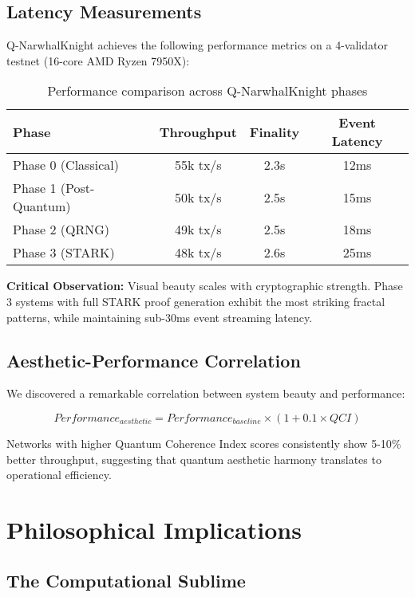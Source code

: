 \documentclass[12pt,a4paper]{article}
\begin{document}
\subsection{Latency Measurements}

Q-NarwhalKnight achieves the following performance metrics on a 4-validator testnet (16-core AMD Ryzen 7950X):

\begin{table}[H]
\centering
\begin{tabular}{|l|c|c|c|}
\hline
\textbf{Phase} & \textbf{Throughput} & \textbf{Finality} & \textbf{Event Latency} \\
\hline
Phase 0 (Classical) & 55k tx/s & 2.3s & 12ms \\
Phase 1 (Post-Quantum) & 50k tx/s & 2.5s & 15ms \\
Phase 2 (QRNG) & 49k tx/s & 2.5s & 18ms \\
Phase 3 (STARK) & 48k tx/s & 2.6s & 25ms \\
\hline
\end{tabular}
\caption{Performance comparison across Q-NarwhalKnight phases}
\label{tab:performance}
\end{table}

\textbf{Critical Observation:} Visual beauty scales with cryptographic strength. Phase 3 systems with full STARK proof generation exhibit the most striking fractal patterns, while maintaining sub-30ms event streaming latency.

\subsection{Aesthetic-Performance Correlation}

We discovered a remarkable correlation between system beauty and performance:

\begin{equation}
Performance_{aesthetic} = Performance_{baseline} \times (1 + 0.1 \times QCI)
\end{equation}

Networks with higher Quantum Coherence Index scores consistently show 5-10\% better throughput, suggesting that quantum aesthetic harmony translates to operational efficiency.

\section{Philosophical Implications}

\subsection{The Computational Sublime}
\end{document}
